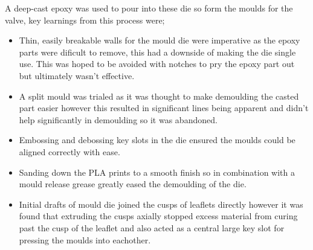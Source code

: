 A deep-cast epoxy was used to pour into these die so form the moulds for the valve, key learnings from this process were;
\begin{itemize}
    \item Thin, easily breakable walls for the mould die were imperative as the epoxy parts were dificult to remove, this had a downside of making the die single use. This was hoped to be avoided with notches to pry the epoxy part out but ultimately wasn't effective.
    \item A split mould was trialed as it was thought to make demoulding the casted part easier however this resulted in significant lines being apparent and didn't help significantly in demoulding so it was abandoned.
    \item Embossing and debossing key slots in the die ensured the moulds could be aligned correctly with ease.
    \item Sanding down the \gls{PLA} prints to a smooth finish so in combination with a mould release grease greatly eased the demoulding of the die.
    \item Initial drafts of mould die joined the cusps of leaflets directly however it was found that extruding the cusps axially stopped excess material from curing past the cusp of the leaflet and also acted as a central large key slot for pressing the moulds into eachother.
\end{itemize}
